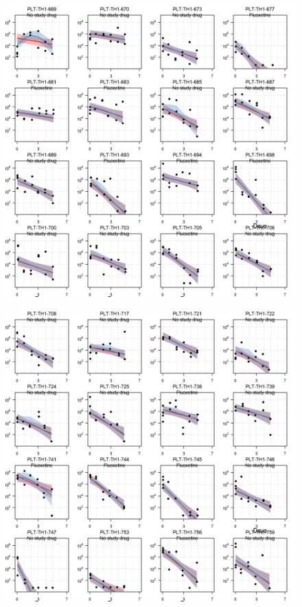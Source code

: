 \documentclass[
  letterpaper,
  DIV=11,
  numbers=noendperiod]{scrartcl}
\begin{document}
\begin{figure}[H]

{\centering \includegraphics{Fluoxetine_analysis_files/figure-pdf/individ_data-15.png}

}

\end{figure}

\begin{figure}[H]

{\centering \includegraphics{Fluoxetine_analysis_files/figure-pdf/individ_data-16.png}

}

\end{figure}
\end{document}
